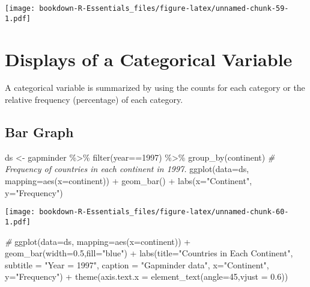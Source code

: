 \documentclass[
]{book}
\newenvironment{Shaded}{\begin{snugshade}}{\end{snugshade}}
\newcommand{\AttributeTok}[1]{\textcolor[rgb]{0.77,0.63,0.00}{#1}}
\newcommand{\CommentTok}[1]{\textcolor[rgb]{0.56,0.35,0.01}{\textit{#1}}}
\newcommand{\DecValTok}[1]{\textcolor[rgb]{0.00,0.00,0.81}{#1}}
\newcommand{\FloatTok}[1]{\textcolor[rgb]{0.00,0.00,0.81}{#1}}
\newcommand{\FunctionTok}[1]{\textcolor[rgb]{0.00,0.00,0.00}{#1}}
\newcommand{\NormalTok}[1]{#1}
\newcommand{\OtherTok}[1]{\textcolor[rgb]{0.56,0.35,0.01}{#1}}
\newcommand{\SpecialCharTok}[1]{\textcolor[rgb]{0.00,0.00,0.00}{#1}}
\newcommand{\StringTok}[1]{\textcolor[rgb]{0.31,0.60,0.02}{#1}}
\begin{document}
\texttt{[image: bookdown-R-Essentials\_files/figure-latex/unnamed-chunk-59-1.pdf]}

\hypertarget{displays-of-a-categorical-variable}{%
\section{Displays of a Categorical Variable}\label{displays-of-a-categorical-variable}}

A categorical variable is summarized by using the counts for each category or the relative frequency (percentage) of each category.

\hypertarget{bar-graph}{%
\subsection{Bar Graph}\label{bar-graph}}

\begin{Shaded}
\begin{Highlighting}[]
\NormalTok{ds }\OtherTok{\textless{}{-}}\NormalTok{ gapminder }\SpecialCharTok{\%\textgreater{}\%} 
  \FunctionTok{filter}\NormalTok{(year}\SpecialCharTok{==}\DecValTok{1997}\NormalTok{) }\SpecialCharTok{\%\textgreater{}\%} 
  \FunctionTok{group\_by}\NormalTok{(continent) }
\CommentTok{\# Frequency of countries in each continent in 1997.}
\FunctionTok{ggplot}\NormalTok{(}\AttributeTok{data=}\NormalTok{ds, }\AttributeTok{mapping=}\FunctionTok{aes}\NormalTok{(}\AttributeTok{x=}\NormalTok{continent)) }\SpecialCharTok{+} 
  \FunctionTok{geom\_bar}\NormalTok{() }\SpecialCharTok{+}
  \FunctionTok{labs}\NormalTok{(}\AttributeTok{x=}\StringTok{"Continent"}\NormalTok{, }\AttributeTok{y=}\StringTok{"Frequency"}\NormalTok{)}
\end{Highlighting}
\end{Shaded}

\texttt{[image: bookdown-R-Essentials\_files/figure-latex/unnamed-chunk-60-1.pdf]}

\begin{Shaded}
\begin{Highlighting}[]
\CommentTok{\#}
\FunctionTok{ggplot}\NormalTok{(}\AttributeTok{data=}\NormalTok{ds, }\AttributeTok{mapping=}\FunctionTok{aes}\NormalTok{(}\AttributeTok{x=}\NormalTok{continent)) }\SpecialCharTok{+} 
  \FunctionTok{geom\_bar}\NormalTok{(}\AttributeTok{width=}\FloatTok{0.5}\NormalTok{,}\AttributeTok{fill=}\StringTok{"blue"}\NormalTok{) }\SpecialCharTok{+}
  \FunctionTok{labs}\NormalTok{(}\AttributeTok{title=}\StringTok{"Countries in Each Continent"}\NormalTok{,}
       \AttributeTok{subtitle =} \StringTok{"Year = 1997"}\NormalTok{,}
       \AttributeTok{caption =} \StringTok{"Gapminder data"}\NormalTok{,}
       \AttributeTok{x=}\StringTok{"Continent"}\NormalTok{, }
       \AttributeTok{y=}\StringTok{"Frequency"}\NormalTok{) }\SpecialCharTok{+}
  \FunctionTok{theme}\NormalTok{(}\AttributeTok{axis.text.x =} \FunctionTok{element\_text}\NormalTok{(}\AttributeTok{angle=}\DecValTok{45}\NormalTok{,}\AttributeTok{vjust =} \FloatTok{0.6}\NormalTok{))}
\end{Highlighting}
\end{Shaded}
\end{document}
